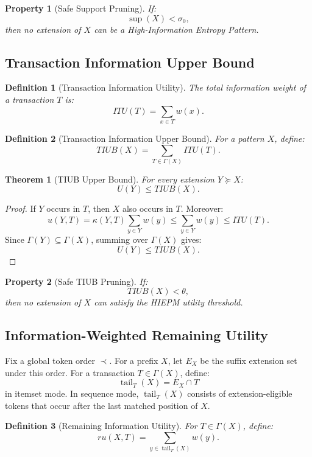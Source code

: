 \documentclass[11pt,a4paper]{article}
\newtheorem{definition}{Definition}
\newtheorem{theorem}{Theorem}
\newtheorem{property}{Property}
\newcommand{\supp}{\operatorname{sup}}
\newcommand{\tail}{\operatorname{tail}}
\begin{document}
\begin{property}[Safe Support Pruning]
If:
\[
\supp(X)<\sigma_0,
\]
then no extension of \(X\) can be a High-Information Entropy Pattern.
\end{property}

\subsection{Transaction Information Upper Bound}

\begin{definition}[Transaction Information Utility]
The total information weight of a transaction \(T\) is:
\[
ITU(T)=\sum_{x\in T}w(x).
\]
\end{definition}

\begin{definition}[Transaction Information Upper Bound]
For a pattern \(X\), define:
\[
TIUB(X)=
\sum_{T\in\Gamma(X)}
ITU(T).
\]
\end{definition}

\begin{theorem}[TIUB Upper Bound]
For every extension \(Y\succeq X\):
\[
U(Y)\le TIUB(X).
\]
\end{theorem}

\begin{proof}
If \(Y\) occurs in \(T\), then \(X\) also occurs in \(T\). Moreover:
\[
u(Y,T)
=
\kappa(Y,T)\sum_{y\in Y}w(y)
\le
\sum_{y\in Y}w(y)
\le
ITU(T).
\]
Since \(\Gamma(Y)\subseteq\Gamma(X)\), summing over \(\Gamma(X)\) gives:
\[
U(Y)\le TIUB(X).
\]
\end{proof}

\begin{property}[Safe TIUB Pruning]
If:
\[
TIUB(X)<\theta,
\]
then no extension of \(X\) can satisfy the HIEPM utility threshold.
\end{property}

\subsection{Information-Weighted Remaining Utility}

Fix a global token order \(\prec\). For a prefix \(X\), let \(E_X\) be the suffix extension set under this order. For a transaction \(T\in\Gamma(X)\), define:
\[
\tail_T(X)=E_X\cap T
\]
in itemset mode. In sequence mode, \(\tail_T(X)\) consists of extension-eligible tokens that occur after the last matched position of \(X\).

\begin{definition}[Remaining Information Utility]
For \(T\in\Gamma(X)\), define:
\[
ru(X,T)=\sum_{y\in\tail_T(X)}w(y).
\]
\end{definition}
\end{document}
